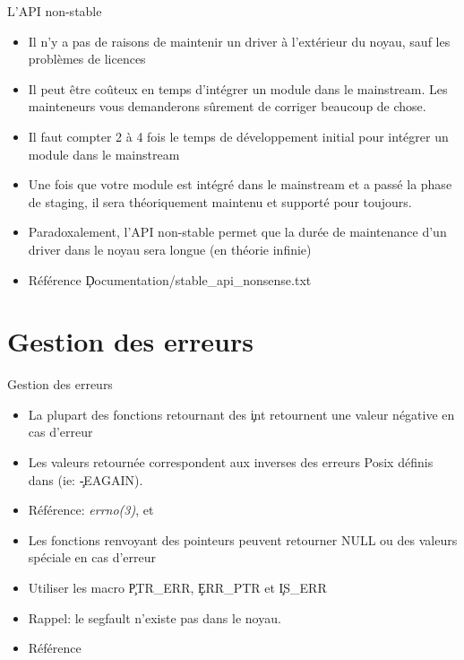 \begin{frame}[fragile=singleslide]{L'API non-stable}
  \begin{itemize} 
  \item Il n'y  a pas de raisons de maintenir  un driver à l'extérieur
    du noyau, sauf les problèmes de licences
  \item  Il peut être  coûteux en  temps d'intégrer  un module  dans le
    mainstream. Les  mainteneurs vous demanderons  sûrement de corriger
    beaucoup de chose.
  \item Il faut  compter 2 à 4 fois le  temps de développement initial
    pour intégrer un module dans le mainstream
  \item Une fois que votre module  est intégré dans le mainstream et a
    passé  la phase  de  staging, il  sera  théoriquement maintenu  et
    supporté pour toujours.
    \item Paradoxalement, l'API non-stable permet que la durée de maintenance d'un driver dans le noyau sera longue (en théorie infinie)
  \item Référence \c{Documentation/stable_api_nonsense.txt}
  \end{itemize} 
\end{frame} 

\section{Gestion des erreurs}

\begin{frame}[fragile=singleslide]{Gestion des erreurs}
  \begin{itemize} 
  \item La plupart des fonctions retournant des \c{int} retournent une
    valeur négative en cas d'erreur
  \item Les  valeurs retournée correspondent aux  inverses des erreurs
    Posix  définis dans   (ie:  \c{-EAGAIN}). 
  \item   Référence:   \emph{errno(3)},      et
  \item  Les  fonctions  renvoyant des  pointeurs  peuvent
    retourner NULL ou des valeurs spéciale en cas d'erreur
  \item Utiliser les macro \c{PTR_ERR}, \c{ERR_PTR} et \c{IS_ERR}
  \item Rappel: le segfault n'existe pas  dans le noyau.
  \item Référence 
  \end{itemize}
\end{frame}

